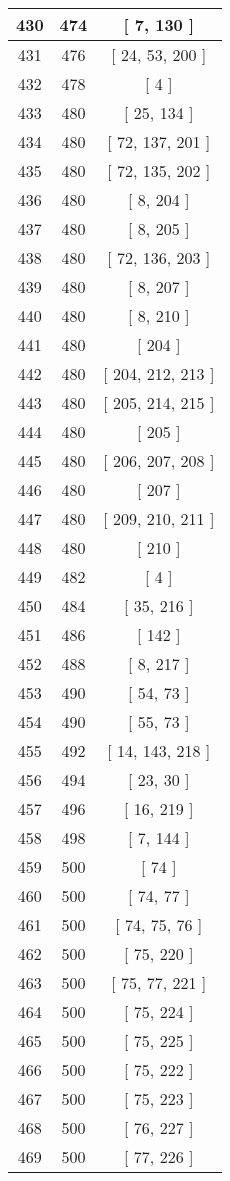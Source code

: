 \begin{center}
\begin{longtable}[H]{|| c c c ||}
\hline
430 & 474 & [ 7, 130 ] \\ 
\hline
431 & 476 & [ 24, 53, 200 ] \\ 
\hline
432 & 478 & [ 4 ] \\ 
\hline
433 & 480 & [ 25, 134 ] \\ 
\hline
434 & 480 & [ 72, 137, 201 ] \\ 
\hline
435 & 480 & [ 72, 135, 202 ] \\ 
\hline
436 & 480 & [ 8, 204 ] \\ 
\hline
437 & 480 & [ 8, 205 ] \\ 
\hline
438 & 480 & [ 72, 136, 203 ] \\ 
\hline
439 & 480 & [ 8, 207 ] \\ 
\hline
440 & 480 & [ 8, 210 ] \\ 
\hline
441 & 480 & [ 204 ] \\ 
\hline
442 & 480 & [ 204, 212, 213 ] \\ 
\hline
443 & 480 & [ 205, 214, 215 ] \\ 
\hline
444 & 480 & [ 205 ] \\ 
\hline
445 & 480 & [ 206, 207, 208 ] \\ 
\hline
446 & 480 & [ 207 ] \\ 
\hline
447 & 480 & [ 209, 210, 211 ] \\ 
\hline
448 & 480 & [ 210 ] \\ 
\hline
449 & 482 & [ 4 ] \\ 
\hline
450 & 484 & [ 35, 216 ] \\ 
\hline
451 & 486 & [ 142 ] \\ 
\hline
452 & 488 & [ 8, 217 ] \\ 
\hline
453 & 490 & [ 54, 73 ] \\ 
\hline
454 & 490 & [ 55, 73 ] \\ 
\hline
455 & 492 & [ 14, 143, 218 ] \\ 
\hline
456 & 494 & [ 23, 30 ] \\ 
\hline
457 & 496 & [ 16, 219 ] \\ 
\hline
458 & 498 & [ 7, 144 ] \\ 
\hline
459 & 500 & [ 74 ] \\ 
\hline
460 & 500 & [ 74, 77 ] \\ 
\hline
461 & 500 & [ 74, 75, 76 ] \\ 
\hline
462 & 500 & [ 75, 220 ] \\ 
\hline
463 & 500 & [ 75, 77, 221 ] \\ 
\hline
464 & 500 & [ 75, 224 ] \\ 
\hline
465 & 500 & [ 75, 225 ] \\ 
\hline
466 & 500 & [ 75, 222 ] \\ 
\hline
467 & 500 & [ 75, 223 ] \\ 
\hline
468 & 500 & [ 76, 227 ] \\ 
\hline
469 & 500 & [ 77, 226 ] \\ 
\hline
\end{longtable}
\end{center}
